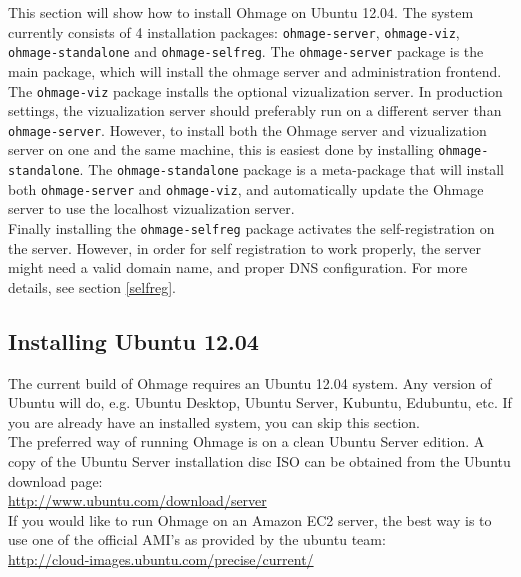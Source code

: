\documentclass{scrartcl}
\begin{document}
This section will show how to install Ohmage on Ubuntu 12.04. The system
currently consists of 4 installation packages: \texttt{ohmage-server},
\texttt{ohmage-viz}, \texttt{ohmage-standalone} and \texttt{ohmage-selfreg}.
The \texttt{ohmage-server} package is the main package, which will install the
ohmage server and administration frontend. The \texttt{ohmage-viz} package
installs the optional vizualization server. In production settings, the
vizualization server should preferably run on a different server than
\texttt{ohmage-server}. However, to install both the Ohmage server and
vizualization server on one and the same machine, this is easiest done by
installing \texttt{ohmage-standalone}. The \texttt{ohmage-standalone} package
is a meta-package that will install both \texttt{ohmage-server} and
\texttt{ohmage-viz}, and automatically update the Ohmage server to use the
localhost vizualization server. \\

\noindent Finally installing the \texttt{ohmage-selfreg} package activates the
self-registration on the server. However, in order for self registration to
work properly, the server might need a valid domain name, and proper DNS
configuration. For more details, see section \ref{selfreg}.

\subsection{Installing Ubuntu 12.04}

\noindent The current build of Ohmage requires an Ubuntu 12.04 system. Any
version of Ubuntu will do, e.g. Ubuntu Desktop, Ubuntu Server, Kubuntu,
Edubuntu, etc. If you are already have an installed system, you can skip this
section. \\

\noindent The preferred way of running Ohmage is on a clean Ubuntu Server
edition. A copy of the Ubuntu Server installation disc ISO can be obtained from
the Ubuntu download page: \\

\url{http://www.ubuntu.com/download/server} \\

\noindent If you would like to run Ohmage on an Amazon EC2 server, the best way
is to use one of the official AMI's as provided by the ubuntu team: \\

\url{http://cloud-images.ubuntu.com/precise/current/} \\
\end{document}
